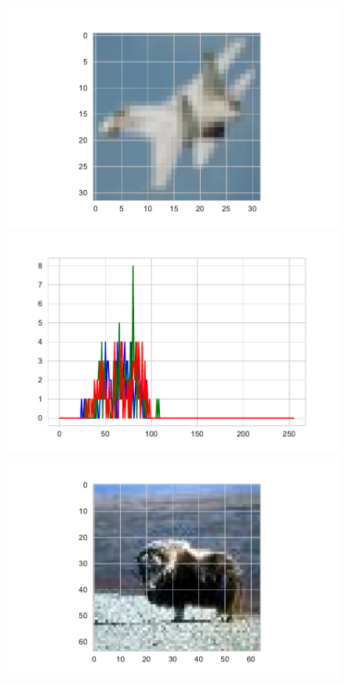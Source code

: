\documentclass[11pt]{article}
\begin{document}
\begin{figure}[H]
\begin{minipage}[c]{0.4\textwidth}
\includegraphics[width=1\linewidth]{figures/Example_picture_Cifar.pdf}
\end{minipage}
\begin{minipage}[d]{0.6\textwidth}
\includegraphics[width=1\linewidth]{figures/Example_picture_Cifar_hist.pdf}
\end{minipage}
\begin{minipage}[c]{0.4\textwidth}
\includegraphics[width=1\linewidth]{figures/Example_picture_Tiny_Image.pdf}

\end{minipage}
\end{figure}
\end{document}
